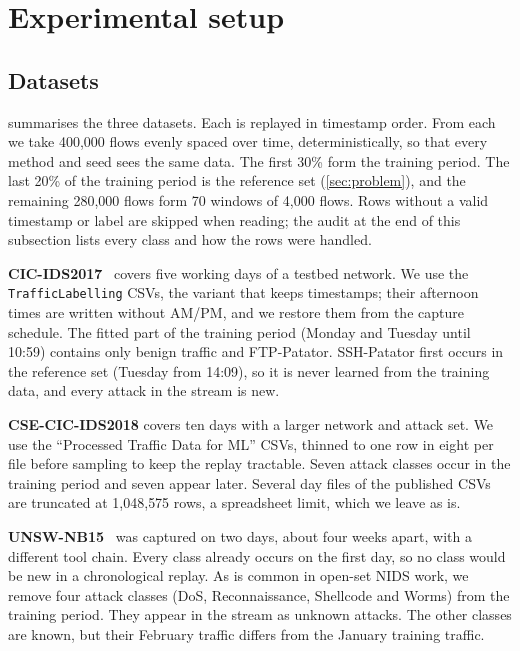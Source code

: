 \section{Experimental setup}
\label{sec:setup}

\subsection{Datasets}
 summarises the three datasets. Each is replayed in timestamp order. From each we take 400{,}000
flows evenly spaced over time, deterministically, so that every method and seed sees the same data. The first
30\% form the training period. The last 20\% of the training period is the reference set (\cref{sec:problem}),
and the remaining 280{,}000 flows form 70 windows of 4{,}000 flows. Rows without a valid timestamp or label are
skipped when reading; the audit at the end of this subsection lists every class and how the rows were
handled.

\textbf{CIC-IDS2017}~\cite{sharafaldin2018} covers five working days of a testbed network. We use the
\texttt{TrafficLabelling} CSVs, the variant that keeps timestamps; their afternoon times are written without
AM/PM, and we restore them from the capture schedule. The fitted part of the training period (Monday and Tuesday
until 10:59) contains only benign traffic and FTP-Patator. SSH-Patator first occurs in the reference set
(Tuesday from 14:09), so it is never learned from the training data, and every attack in the stream is new.

\textbf{CSE-CIC-IDS2018} covers ten days with a larger network and attack set. We use the ``Processed Traffic
Data for ML'' CSVs, thinned to one row in eight per file before sampling to keep the replay tractable. Seven
attack classes occur in the training period and seven appear later. Several day files of the published CSVs are
truncated at 1{,}048{,}575 rows, a spreadsheet limit, which we leave as is.

\textbf{UNSW-NB15}~\cite{moustafa2015unsw} was captured on two days, about four weeks apart, with a different
tool chain. Every class already occurs on the first day, so no class would be new in a chronological replay. As is
common in open-set NIDS work, we remove four attack classes (DoS, Reconnaissance, Shellcode and Worms) from the
training period. They appear in the stream as unknown attacks. The other classes are known, but their February
traffic differs from the January training traffic.

